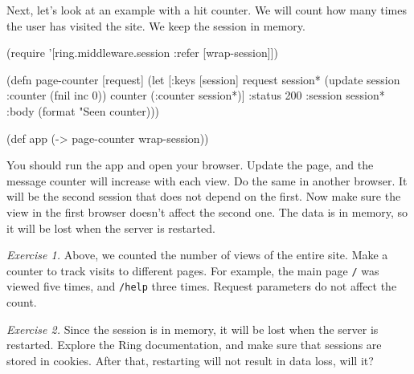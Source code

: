 Next, let's look at an example with a hit counter. We will count how many times the user has visited the site. We keep the session in memory.


\ifx\DEVICETYPE\MOBILE

\begin{clojure}
(require '[ring.middleware.session
           :refer [wrap-session]])

(defn page-counter [request]
  (let [{:keys [session]} request
        session* (update session
                   :counter (fnil inc 0))
        counter (:counter session*)]
    {:status 200
     :session session*
     :body (format "Seen %
                   counter)}))

(def app (-> page-counter
             wrap-session))
\end{clojure}

\else


\fi

You should run the app and open your browser. Update the page, and the message counter will increase with each view. Do the same in another browser. It will be the second session that does not depend on the first. Now make sure the view in the first browser doesn't affect the second one. The data is in memory, so it will be lost when the server is restarted.

\emph{Exercise 1.} Above, we counted the number of views of the entire site. Make a counter to track visits to different pages. For example, the main page \verb|/| was
viewed five times, and \verb|/help| three times. Request parameters do not affect the count.

\emph{Exercise 2.} Since the session is in memory, it will be lost when the server is restarted. Explore the Ring documentation, and make sure that sessions are stored in cookies. After that, restarting will not result in data loss, will it?

